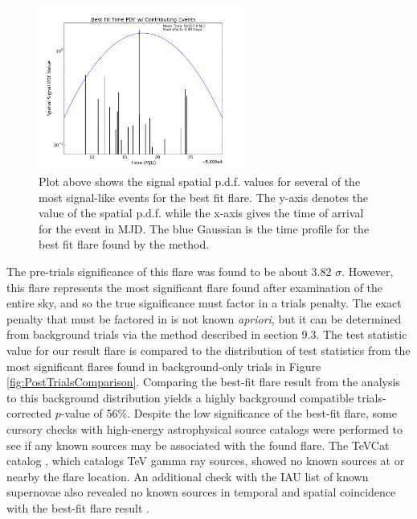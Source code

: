 \documentclass{gatech-thesis}
\begin{document}
\begin{figure}[ht]
  \begin{center}
    \includegraphics[width=0.6\textwidth,keepaspectratio]{SpatialPDFValue_EventsArrivingNearFlareTime.png}
  \end{center}
  \caption[Time of Arrival for Most Signal-like Events]{Plot above shows the signal spatial p.d.f. values for several of the most signal-like events for the best fit flare. The y-axis denotes the value of the spatial p.d.f. while the x-axis gives the time of arrival for the event in MJD. The blue Gaussian is the time profile for the best fit flare found by the method.}
  \label{fig:TopEvents}
\end{figure}

The pre-trials significance of this flare was found to be about 3.82 $\sigma$. However, this flare represents the most significant flare found after examination of the entire sky, and so the true significance must factor in a trials penalty. The exact penalty that must be factored in is not known \textit{apriori}, but it can be determined from background trials via the method described in section 9.3. The test statistic value for our result flare is compared to the distribution of test statistics from the most significant flares found in background-only trials in Figure \ref{fig:PostTrialsComparison}. Comparing the best-fit flare result from the analysis to this background distribution yields a highly background compatible trials-corrected $p$-value of 56$\%$. Despite the low significance of the best-fit flare, some cursory checks with high-energy astrophysical source catalogs were performed to see if any known sources may be associated with the found flare. The TeVCat catalog \cite{TeVCat}, which catalogs TeV gamma ray sources, showed no known sources at or nearby the flare location. An additional check with the IAU list of known supernovae also revealed no known sources in temporal and spatial coincidence with the best-fit flare result \cite{SNeCatIAU}.
\end{document}
